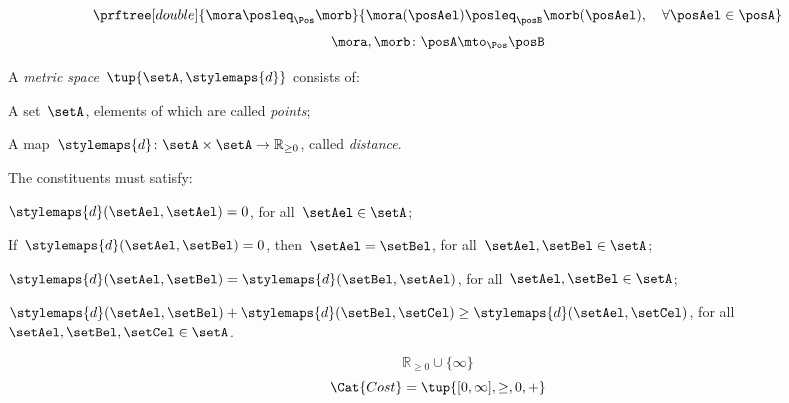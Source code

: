 {\begin{forslides}
\begin{equation*}
        \end{equation*}
        \begin{equation*}
            \label{eq:poset_pos_a}
            \prftree[double]{\mora \posleq_\Pos \morb}{\mora(\posAel)\posleq_\posB \morb(\posAel), \quad \forall \posAel \in \posA}
        \end{equation*}
        \begin{equation*}
            \label{eq:poset_pos_b}
            \mora,\morb\colon \posA\mto_\Pos \posB
        \end{equation*}
        \begin{definition}
            \label{def:metric_space}
            A \emph{metric space}~$\tup{\setA,\stylemaps{d}}$ consists of:
            \begin{compactenum}
                \item A set~$\setA$, elements of which are called \emph{points};
                \item A map~$\stylemaps{d}\colon \setA\times \setA \to \mathbb{R}_{\geq 0}$, called \emph{distance}.
            \end{compactenum}
            The constituents must satisfy:
            \begin{compactitem}
                \item $\stylemaps{d}(\setAel,\setAel)=0$, for all~$\setAel\in \setA$;
                \item If~$\stylemaps{d}(\setAel, \setBel)=0$, then~$\setAel=\setBel$, for all~$\setAel,\setBel\in \setA$;
                \item $\stylemaps{d}(\setAel, \setBel)=\stylemaps{d}(\setBel, \setAel)$, for all~$\setAel,\setBel\in \setA$;
                \item $\stylemaps{d}(\setAel, \setBel)+\stylemaps{d}(\setBel, \setCel)\geq \stylemaps{d}(\setAel, \setCel)$, for all~$\setAel,\setBel,\setCel\in \setA$.
            \end{compactitem}
        \end{definition}
        \begin{equation*}
            \label{eq:r_with_inft}
            \mathbb{R}_{\geq 0}\cup \{\infty\}
        \end{equation*}
        \begin{equation*}
            \label{eq:cost_cat}
            \Cat{Cost}=\tup{[0,\infty], \geq, 0, +}
        \end{equation*}
        \begin{equation*}
            \label{eq:enriched_fun_a}

\end{equation*}
\end{forslides}}
